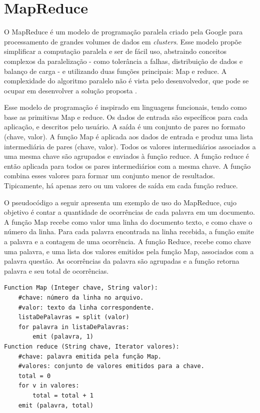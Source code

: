\section{MapReduce}
O MapReduce é um modelo de programação paralela criado pela Google para processamento de grandes volumes de dados em \textit{clusters}. Esse modelo propõe simplificar a computação paralela e ser de fácil uso, abstraindo conceitos complexos da paralelização - como tolerância a falhas, distribuição de dados e balanço de carga - e utilizando duas funções principais: Map e reduce. A complexidade do algoritmo paralelo não é vista pelo desenvolvedor, que pode se ocupar em desenvolver a solução proposta \cite{Dean:2008}.

Esse modelo de programação é inspirado em linguagens funcionais, tendo como base as primitivas Map e reduce.
Os dados de entrada são específicos para cada aplicação, e descritos pelo usuário. A saída é um conjunto de pares no formato (chave, valor).
A função Map é aplicada aos dados de entrada e produz uma lista intermediária de pares (chave, valor). Todos os valores intermediários associados a uma mesma chave são agrupados e enviados à função reduce.
A função reduce é então aplicada para todos os pares intermediários com a mesma chave. A função combina esses valores para formar um conjunto menor de resultados.
Tipicamente, há apenas zero ou um valores de saída em cada função reduce.

O pseudocódigo a seguir apresenta um exemplo de uso do MapReduce, cujo objetivo é contar a quantidade de ocorrências de cada palavra em um documento. A função Map recebe como valor uma linha do documento texto, e como chave o número da linha. Para cada palavra encontrada na linha recebida, a função emite a palavra e a contagem de uma ocorrência. A função Reduce, recebe como chave uma palavra, e uma lista dos valores emitidos pela função Map, associados com a palavra questão. As ocorrências da palavra são agrupadas e a função retorna palavra e seu total de ocorrências.

\begin{lstlisting}[label=some-code,caption=some-code]
Function Map (Integer chave, String valor):
	#chave: número da linha no arquivo.
	#valor: texto da linha correspondente.
	listaDePalavras = split (valor)
	for palavra in listaDePalavras:
		emit (palavra, 1)
Function reduce (String chave, Iterator valores):
	#chave: palavra emitida pela função Map.
	#valores: conjunto de valores emitidos para a chave.
	total = 0
	for v in valores:
		total = total + 1
	emit (palavra, total)
\end{lstlisting}

